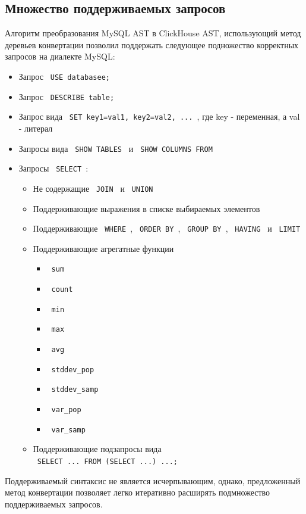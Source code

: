 \subsection{Множество поддерживаемых запросов} \label{part:queries}
Алгоритм преобразования MySQL AST в ClickHouse AST, использующий метод деревьев конвертации позволил поддержать следующее подножество корректных запросов на диалекте MySQL:
\begin{itemize}
    \item Запрос \texttt{ USE databasee; }
    \item Запрос \texttt{ DESCRIBE table; }
    \item Запрос вида \texttt{ SET key1=val1, key2=val2, ... }, где key - переменная, а val - литерал
    \item Запросы вида \texttt{ SHOW TABLES } и \texttt{ SHOW COLUMNS FROM }
    \item Запросы \texttt{ SELECT }:
    \begin{itemize}
        \item Не содержащие \texttt{ JOIN } и \texttt{ UNION }
        \item Поддерживающие выражения в списке выбираемых элементов
        \item Поддерживающие \texttt{ WHERE }, \texttt{ ORDER BY }, \texttt{ GROUP BY }, \texttt{ HAVING } и \texttt{ LIMIT }
        \item Поддерживающие агрегатные функции 
        \begin{itemize}
            \item \texttt{ sum }
            \item \texttt{ count }
            \item \texttt{ min }
            \item \texttt{ max }
            \item \texttt{ avg }
            \item \texttt{ stddev_pop}
            \item \texttt{ stddev_samp }
            \item \texttt{ var_pop }
            \item \texttt{ var_samp }
        \end{itemize}
        \item Поддерживающие подзапросы вида \\ \texttt{ SELECT ... FROM (SELECT ...) ...; }
    \end{itemize}
\end{itemize}

Поддерживаемый синтаксис не является исчерпывающим, однако, предложенный метод конвертации позволяет легко итеративно расширять подмножество поддерживаемых запросов.

\pagebreak
